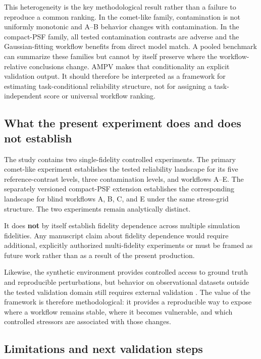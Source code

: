 This heterogeneity is the key methodological result rather than a
failure to reproduce a common ranking. In the comet-like family,
contamination is not uniformly monotonic and A--B behavior changes with
contamination. In the compact-PSF family, all tested contamination
contrasts are adverse and the Gaussian-fitting workflow benefits from
direct model match. A pooled benchmark can summarize these families but
cannot by itself preserve where the workflow-relative conclusions
change. AMPV makes that conditionality an explicit validation output.
It should therefore be interpreted as a framework for estimating
task-conditional reliability structure, not for assigning a
task-independent score or universal workflow ranking.

\subsection{What the present experiment does and does not
establish}\label{what-the-present-experiment-does-and-does-not-establish}

The study contains two single-fidelity controlled experiments.
The primary comet-like experiment establishes the tested reliability
landscape for its five reference-contrast levels, three contamination
levels, and workflows A--E. The separately versioned compact-PSF
extension establishes the corresponding landscape for blind workflows
A, B, C, and E under the same stress-grid structure. The two experiments
remain analytically distinct.

It does \textbf{not} by itself establish fidelity dependence across
multiple simulation fidelities. \cite{ref5} Any manuscript claim about
fidelity dependence would require additional, explicitly authorized
multi-fidelity experiments or must be framed as future work rather than
as a result of the present production.

Likewise, the synthetic environment provides controlled access to ground
truth and reproducible perturbations, but behavior on observational
datasets outside the tested validation domain still requires external
validation \cite{ref5,ref6}. The value of the framework is therefore
methodological: it provides a reproducible way to expose where a
workflow remains stable, where it becomes vulnerable, and which
controlled stressors are associated with those changes.

\subsection{Limitations and next validation
steps}\label{limitations-and-next-validation-steps}

